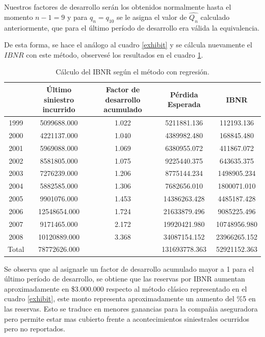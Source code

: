 \documentclass[
  12pt,
]{article}
\begin{document}
Nuestros factores de desarrollo serán los obtenidos normalmente hasta el
momento \(n-1=9\) y para \(q_n=q_{10}\) se le asigna el valor de
\(\hat{Q_n}\) calculado anteriormente, que para el último período de
desarrollo era válida la equivalencia.

De esta forma, se hace el análogo al cuadro \ref{exhibit} y se cálcula
nuevamente el \(IBNR\) con este método, observesé los resultados en el
cuadro \ref{exhibit2}.

\begin{table}[ht]
\centering
\caption{Cálculo del IBNR según el método con regresión.} 
\label{exhibit2}
\begingroup\fontsize{10pt}{10pt}\selectfont
\begin{tabular}{ccccc}
  \hline
 & Último siniestro incurrido & Factor de desarrollo acumulado & Pérdida Esperada & IBNR \\ 
  \hline
1999 & 5099688.000 & 1.022 & 5211881.136 & 112193.136 \\ 
  2000 & 4221137.000 & 1.040 & 4389982.480 & 168845.480 \\ 
  2001 & 5969088.000 & 1.069 & 6380955.072 & 411867.072 \\ 
  2002 & 8581805.000 & 1.075 & 9225440.375 & 643635.375 \\ 
  2003 & 7276239.000 & 1.206 & 8775144.234 & 1498905.234 \\ 
  2004 & 5882585.000 & 1.306 & 7682656.010 & 1800071.010 \\ 
  2005 & 9901076.000 & 1.453 & 14386263.428 & 4485187.428 \\ 
  2006 & 12548654.000 & 1.724 & 21633879.496 & 9085225.496 \\ 
  2007 & 9171465.000 & 2.172 & 19920421.980 & 10748956.980 \\ 
  2008 & 10120889.000 & 3.368 & 34087154.152 & 23966265.152 \\ 
  Total & 78772626.000 &  & 131693778.363 & 52921152.363 \\ 
   \hline
\end{tabular}
\endgroup
\end{table}

Se observa que al asignarle un factor de desarrollo acumulado mayor a 1
para el último período de desarrollo, se obtiene que las reservas por
IBNR aumentan aproximadamente en \$3.000.000 respecto al método clásico
representado en el cuadro \ref{exhibit}, este monto representa
aproximadamente un aumento del \%5 en las reservas. Esto se traduce en
menores ganancias para la compañia aseguradora pero permite estar mas
cubierto frente a acontecimientos siniestrales ocurridos pero no
reportados.
\end{document}
